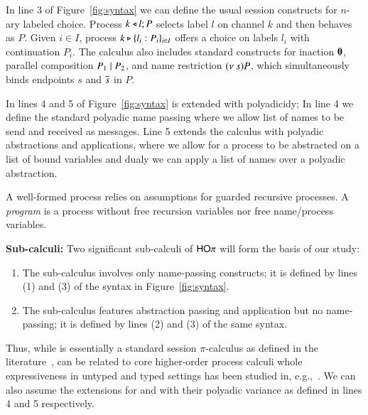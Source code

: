 In line 3 of Figure~\ref{fig:syntax} we can define the usual session constructs
for $n$-ary labeled choice.
Process $k \triangleleft l ; P$ selects label $l$ on channel $k$ and then behaves as $P$. 
Given $i \in I$, 
process $k \triangleright \{l_i:P_i\}_{i \in I}$ offers a choice on labels $l_i$ with
continuation $P_i$.
The calculus also includes standard constructs for 
inaction $\mathbf{0}$, 
parallel composition $P_1 \;|\; P_2$, and 
name restriction $(\nu\ s) P$, which simultaneously binds endpoints $s$ and $\overline{s}$ in $P$.

In lines 4 and 5 of Figure~\ref{fig:syntax} \HOp is extended with polyadicidy;
In line 4 we define the standard polyadic name passing where we allow 
list of names to be send and received as messages. 
Line 5 extends the calculus with polyadic abstractions and applications,
where we allow for a process to be abstracted on a list of
bound variables and dualy we can apply a list of names
over a polyadic abstraction.

A well-formed process relies on assumptions for guarded recursive processes.
A \emph{program} is a process without free 
recursion variables nor free name/process variables.



{\bf Sub-calculi:}
Two significant sub-calculi of $\mathsf{HO}\pi$ will form the basis of our study:
%
\begin{enumerate}[-]
	\item	The sub-calculus \sesp involves only name-passing constructs; it is 
		defined by lines (1) and (3) of the syntax in Figure~\ref{fig:syntax}.

	\item	The sub-calculus \HO features abstraction passing and application but no name-passing; 
		it is defined by lines (2) and (3) of the same syntax.
\end{enumerate}
%
Thus, while \sesp is essentially a standard session $\pi$-calculus as defined in the literature~\cite{},
\HO can be related to core higher-order process calculi whole expressiveness in untyped and typed settings
has been studied in, e.g.,~\cite{}. We can also assume the extensions for \sesp and \HO with their
polyadic variance as defined in lines 4 and 5 respectively.


